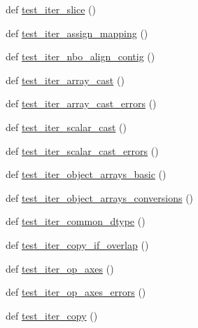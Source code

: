 \begin{DoxyCompactItemize}
\item 
def \hyperlink{namespacenumpy_1_1core_1_1tests_1_1test__nditer_abdce6900cf16e7b13522327f647681c3}{test\+\_\+iter\+\_\+slice} ()
\item 
def \hyperlink{namespacenumpy_1_1core_1_1tests_1_1test__nditer_a29f0ac4c0a9d3e14f9828767a06e9b11}{test\+\_\+iter\+\_\+assign\+\_\+mapping} ()
\item 
def \hyperlink{namespacenumpy_1_1core_1_1tests_1_1test__nditer_a6cef9c888ada925ccaa14ed46d96c38a}{test\+\_\+iter\+\_\+nbo\+\_\+align\+\_\+contig} ()
\item 
def \hyperlink{namespacenumpy_1_1core_1_1tests_1_1test__nditer_a48a3f486967275b08a7a2f8ac37cf982}{test\+\_\+iter\+\_\+array\+\_\+cast} ()
\item 
def \hyperlink{namespacenumpy_1_1core_1_1tests_1_1test__nditer_a484de8db3b173432db96a6e4a0132c49}{test\+\_\+iter\+\_\+array\+\_\+cast\+\_\+errors} ()
\item 
def \hyperlink{namespacenumpy_1_1core_1_1tests_1_1test__nditer_afd077ca2785ade30a418ffc8f1c42cfe}{test\+\_\+iter\+\_\+scalar\+\_\+cast} ()
\item 
def \hyperlink{namespacenumpy_1_1core_1_1tests_1_1test__nditer_abc571a6f308ef4dbfa142ef5c3327972}{test\+\_\+iter\+\_\+scalar\+\_\+cast\+\_\+errors} ()
\item 
def \hyperlink{namespacenumpy_1_1core_1_1tests_1_1test__nditer_a715a7e56df668c1fcb61ac99f80bffa0}{test\+\_\+iter\+\_\+object\+\_\+arrays\+\_\+basic} ()
\item 
def \hyperlink{namespacenumpy_1_1core_1_1tests_1_1test__nditer_aec1033b1722af30661d7da19521970ed}{test\+\_\+iter\+\_\+object\+\_\+arrays\+\_\+conversions} ()
\item 
def \hyperlink{namespacenumpy_1_1core_1_1tests_1_1test__nditer_a9580c1040949ee78fb3ea25bf88d00e8}{test\+\_\+iter\+\_\+common\+\_\+dtype} ()
\item 
def \hyperlink{namespacenumpy_1_1core_1_1tests_1_1test__nditer_af808eeede39f0d56079ea6bfb430a4f2}{test\+\_\+iter\+\_\+copy\+\_\+if\+\_\+overlap} ()
\item 
def \hyperlink{namespacenumpy_1_1core_1_1tests_1_1test__nditer_ae4835187582e4f0fc99972c798e5c577}{test\+\_\+iter\+\_\+op\+\_\+axes} ()
\item 
def \hyperlink{namespacenumpy_1_1core_1_1tests_1_1test__nditer_a0f34d36a6e5463b98d663296fbbdc8b5}{test\+\_\+iter\+\_\+op\+\_\+axes\+\_\+errors} ()
\item 
def \hyperlink{namespacenumpy_1_1core_1_1tests_1_1test__nditer_a55be11a45421bbbfaac1e444b63ce108}{test\+\_\+iter\+\_\+copy} ()

\end{DoxyCompactItemize}
